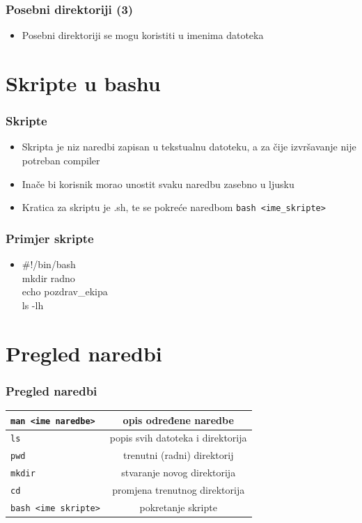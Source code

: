 \documentclass{beamer}
\newcommand{\shell}[1]{\texttt{#1}}
\begin{document}
\begin{frame}[t]
\frametitle{Posebni direktoriji (3)}
\begin{itemize}
  \item Posebni direktoriji se mogu koristiti u imenima datoteka
  \flushleft
\end{itemize}
\end{frame}

\section{Skripte u bashu}
\begin{frame}[t]
\frametitle{Skripte}
\begin{itemize}
  \item Skripta je niz naredbi zapisan u tekstualnu datoteku, a za čije izvršavanje nije potreban compiler
  \item Inače bi korisnik morao unostit svaku naredbu zasebno u ljusku
  \item Kratica za skriptu je .sh, te se pokreće naredbom \shell{bash <ime\_skripte>}
\end{itemize}
\end{frame}

\begin{frame}[t]
\frametitle{Primjer skripte}
\begin{itemize}
  \item \#!/bin/bash \\ mkdir radno \\ echo pozdrav\_ekipa \\ ls -lh
\end{itemize}
\end{frame}

\section{Pregled naredbi}
\begin{frame}[t]
\frametitle{Pregled naredbi}
\begin{tabular}{| l | c |} \hline
  \shell{man <ime naredbe>} & opis određene naredbe \\ \hline
  \shell{ls} & popis svih datoteka i direktorija \\ \hline
  \shell{pwd} & trenutni (radni) direktorij \\ \hline
  \shell {mkdir} & stvaranje novog direktorija \\ \hline
  \shell{cd} & promjena trenutnog direktorija \\ \hline
  \shell{bash <ime skripte>} & pokretanje skripte \\ \hline

\end{tabular}
\end{frame}
\end{document}
